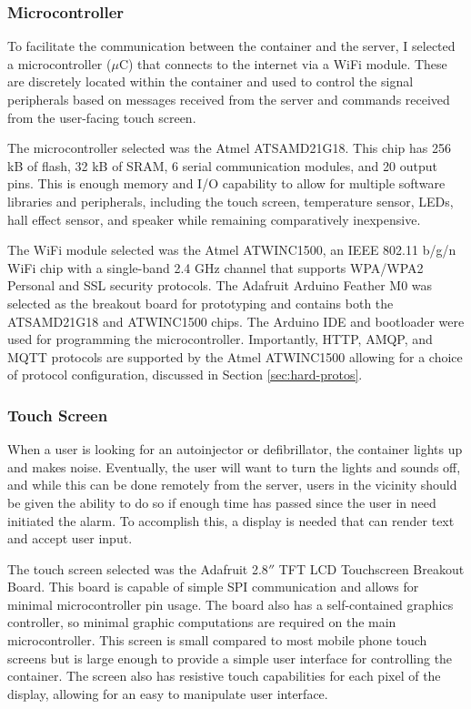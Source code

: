 \subsubsection{Microcontroller}

To facilitate the communication between the container and the server, I selected a microcontroller ($\mu$C) that connects to the internet via a WiFi module. These are discretely located within the container and used to control the signal peripherals based on messages received from the server and commands received from the user-facing touch screen. 

The microcontroller selected was the Atmel ATSAMD21G18. This chip has 256 kB of flash, 32 kB of SRAM, 6 serial communication modules, and 20 output pins. This is enough memory and I/O capability to allow for multiple software libraries and peripherals, including the touch screen, temperature sensor, LEDs, hall effect sensor, and speaker while remaining comparatively inexpensive. 

The WiFi module selected was the Atmel ATWINC1500, an IEEE 802.11 b/g/n WiFi chip with a single-band 2.4 GHz channel that supports WPA/WPA2 Personal and SSL security protocols. The Adafruit Arduino Feather M0 was selected as the breakout board for prototyping and contains both the ATSAMD21G18 and ATWINC1500 chips. The Arduino IDE and bootloader were used for programming the microcontroller. Importantly, HTTP, AMQP, and MQTT protocols are supported by the Atmel ATWINC1500 allowing for a choice of protocol configuration, discussed in Section \ref{sec:hard-protos}.

\subsubsection{Touch Screen}

When a user is looking for an autoinjector or defibrillator, the container lights up and makes noise. Eventually, the user will want to turn the lights and sounds off, and while this can be done remotely from the server, users in the vicinity should be given the ability to do so if enough time has passed since the user in need initiated the alarm. To accomplish this, a display is needed that can render text and accept user input.

The touch screen selected was the Adafruit 2.8$''$ TFT LCD Touchscreen Breakout Board. This board is capable of simple SPI communication and allows for minimal microcontroller pin usage. The board also has a self-contained graphics controller, so minimal graphic computations are required on the main microcontroller. This screen is small compared to most mobile phone touch screens but is large enough to provide a simple user interface for controlling the container. The screen also has resistive touch capabilities for each pixel of the display, allowing for an easy to manipulate user interface.

